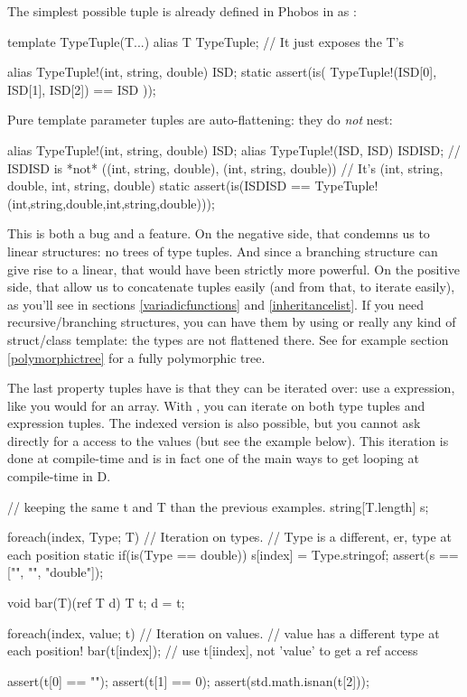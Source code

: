 The simplest possible tuple is already defined in Phobos in  as :

\begin{dcode}
template TypeTuple(T...)
{
   alias T TypeTuple; // It just exposes the T's
}

alias TypeTuple!(int, string, double) ISD;
static assert(is( TypeTuple!(ISD[0], ISD[1], ISD[2]) == ISD ));
\end{dcode}

Pure template parameter tuples are auto-flattening: they do \emph{not} nest:

\begin{dcode}
alias TypeTuple!(int, string, double) ISD;
alias TypeTuple!(ISD, ISD) ISDISD; 
// ISDISD is *not* ((int, string, double), (int, string, double))
// It's (int, string, double, int, string, double)
static assert(is(ISDISD == TypeTuple!(int,string,double,int,string,double)));
\end{dcode}

This is both a bug and a feature. On the negative side, that condemns us to linear structures: no trees of type tuples. And since a branching structure can give rise to a linear, that would have been strictly more powerful. On the positive side, that allow us to concatenate tuples easily (and from that, to iterate easily), as you'll see in sections \ref{variadicfunctions} and \ref{inheritancelist}. If you need recursive/branching structures, you can have them by using  or really any kind of struct/class template: the types are not flattened there. See for example section \ref{polymorphictree} for a fully polymorphic tree.

The last property tuples have is that they can be iterated over: use a  expression, like you would for an array. With , you can iterate on both type tuples and expression tuples. The indexed version is also possible, but you cannot ask directly for a  access to the values (but see the example below). This iteration is done at compile-time and is in fact one of the main ways to get looping at compile-time in D.

\begin{dcode}
// keeping the same t and T than the previous examples.
string[T.length] s;

foreach(index, Type; T) // Iteration on types.
                        // Type is a different, er, type at each position
{
    static if(is(Type == double))
        s[index] = Type.stringof;
}
assert(s ==  ["", "", "double"]);

void bar(T)(ref T d) { T t; d = t;}

foreach(index, value; t) // Iteration on values.
                         // value has a different type at each position!
{
    bar(t[index]); // use t[iindex], not 'value' to get a ref access
}

assert(t[0] == "");
assert(t[1] == 0);
assert(std.math.isnan(t[2]));
\end{dcode}

